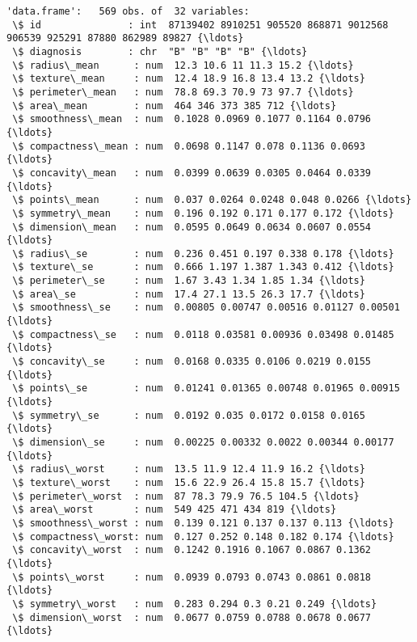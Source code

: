 \documentclass[11pt]{article}
\begin{document}
    \begin{Verbatim}[commandchars=\\\{\}]
'data.frame':	569 obs. of  32 variables:
 \$ id               : int  87139402 8910251 905520 868871 9012568 906539 925291 87880 862989 89827 {\ldots}
 \$ diagnosis        : chr  "B" "B" "B" "B" {\ldots}
 \$ radius\_mean      : num  12.3 10.6 11 11.3 15.2 {\ldots}
 \$ texture\_mean     : num  12.4 18.9 16.8 13.4 13.2 {\ldots}
 \$ perimeter\_mean   : num  78.8 69.3 70.9 73 97.7 {\ldots}
 \$ area\_mean        : num  464 346 373 385 712 {\ldots}
 \$ smoothness\_mean  : num  0.1028 0.0969 0.1077 0.1164 0.0796 {\ldots}
 \$ compactness\_mean : num  0.0698 0.1147 0.078 0.1136 0.0693 {\ldots}
 \$ concavity\_mean   : num  0.0399 0.0639 0.0305 0.0464 0.0339 {\ldots}
 \$ points\_mean      : num  0.037 0.0264 0.0248 0.048 0.0266 {\ldots}
 \$ symmetry\_mean    : num  0.196 0.192 0.171 0.177 0.172 {\ldots}
 \$ dimension\_mean   : num  0.0595 0.0649 0.0634 0.0607 0.0554 {\ldots}
 \$ radius\_se        : num  0.236 0.451 0.197 0.338 0.178 {\ldots}
 \$ texture\_se       : num  0.666 1.197 1.387 1.343 0.412 {\ldots}
 \$ perimeter\_se     : num  1.67 3.43 1.34 1.85 1.34 {\ldots}
 \$ area\_se          : num  17.4 27.1 13.5 26.3 17.7 {\ldots}
 \$ smoothness\_se    : num  0.00805 0.00747 0.00516 0.01127 0.00501 {\ldots}
 \$ compactness\_se   : num  0.0118 0.03581 0.00936 0.03498 0.01485 {\ldots}
 \$ concavity\_se     : num  0.0168 0.0335 0.0106 0.0219 0.0155 {\ldots}
 \$ points\_se        : num  0.01241 0.01365 0.00748 0.01965 0.00915 {\ldots}
 \$ symmetry\_se      : num  0.0192 0.035 0.0172 0.0158 0.0165 {\ldots}
 \$ dimension\_se     : num  0.00225 0.00332 0.0022 0.00344 0.00177 {\ldots}
 \$ radius\_worst     : num  13.5 11.9 12.4 11.9 16.2 {\ldots}
 \$ texture\_worst    : num  15.6 22.9 26.4 15.8 15.7 {\ldots}
 \$ perimeter\_worst  : num  87 78.3 79.9 76.5 104.5 {\ldots}
 \$ area\_worst       : num  549 425 471 434 819 {\ldots}
 \$ smoothness\_worst : num  0.139 0.121 0.137 0.137 0.113 {\ldots}
 \$ compactness\_worst: num  0.127 0.252 0.148 0.182 0.174 {\ldots}
 \$ concavity\_worst  : num  0.1242 0.1916 0.1067 0.0867 0.1362 {\ldots}
 \$ points\_worst     : num  0.0939 0.0793 0.0743 0.0861 0.0818 {\ldots}
 \$ symmetry\_worst   : num  0.283 0.294 0.3 0.21 0.249 {\ldots}
 \$ dimension\_worst  : num  0.0677 0.0759 0.0788 0.0678 0.0677 {\ldots}

    \end{Verbatim}
\end{document}

